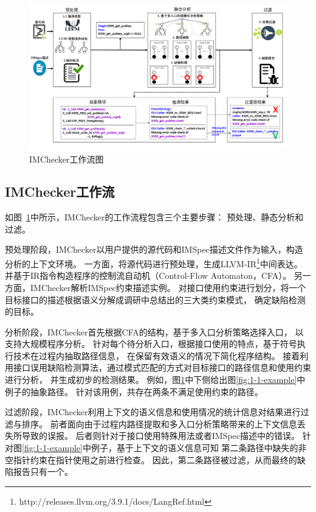 \begin{figure}[b]
	\centering
	\includegraphics[width=\linewidth]{figures/cp3-3-overview.png}
	\caption{
		IMChecker工作流图
	}
	\label{fig:3-3-overview}
\end{figure}

\subsection{IMChecker工作流}

如图~\ref{fig:3-3-overview}中所示，IMChecker的工作流程包含三个主要步骤：
预处理、静态分析和过滤。

预处理阶段，IMChecker以用户提供的源代码和IMSpec描述文件作为输入，构造分析的上下文环境。
一方面，将源代码进行预处理，生成LLVM-IR\footnote{http://releases.llvm.org/3.9.1/docs/LangRef.html}中间表达。
并基于IR指令构造程序的控制流自动机（Control-Flow Automaton，CFA）。
另一方面，IMChecker解析IMSpec约束描述实例。
对接口使用约束进行划分，将一个目标接口的描述根据语义分解成调研中总结出的三大类约束模式，
确定缺陷检测的目标。

分析阶段，IMChecker首先根据CFA的结构，基于多入口分析策略选择入口，
以支持大规模程序分析。
针对每个待分析入口，根据接口使用的特点，基于符号执行技术在过程内抽取路径信息，
在保留有效语义的情况下简化程序结构。
接着利用接口误用缺陷检测算法，通过模式匹配的方式对目标接口的路径信息和使用约束进行分析，
并生成初步的检测结果。
例如，图\ref{fig:3-3-overview}中下侧给出图\ref{fig:1-1-example}中例子的抽象路径。
针对该用例，共存在两条不满足使用约束的路径。

过滤阶段，IMChecker利用上下文的语义信息和使用情况的统计信息对结果进行过滤与排序。
前者面向由于过程内路径提取和多入口分析策略带来的上下文信息丢失所导致的误报。
后者则针对于接口使用特殊用法或者IMSpec描述中的错误。
针对图\ref{fig:1-1-example}中例子，基于上下文的语义信息可知
第二条路径中缺失的非空指针约束在指针使用之前进行检查。
因此，第二条路径被过滤，从而最终的缺陷报告只有一个。

